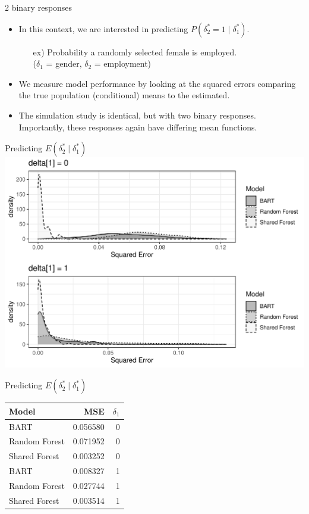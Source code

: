 \documentclass{beamer}
\begin{document}
\begin{frame}{2 binary responses}
\begin{itemize}
\item In this context, we are interested in predicting $P(\delta^*_2=1 \mid \delta^*_1)$.
\begin{itemize}
\item[ex)] Probability a randomly selected female is employed. \\($\delta_1$ = gender, $\delta_2$ = employment)
\end{itemize}
\item We measure model performance by looking at the squared errors comparing the true population (conditional) means to the estimated. 

\item The simulation study is identical, but with two binary responses. Importantly, these responses again have differing mean functions. 
\end{itemize}
\end{frame}

\begin{frame}{Predicting $E(\delta_2^* \mid \delta_1^*)$ }
\includegraphics[width = .9\linewidth]{binary_sim_results.pdf}
\end{frame}

\begin{frame}{Predicting $E(\delta_2^* \mid \delta_1^*)$ }
\begin{table}[ht]
\centering
\begin{tabular}{lrr}
  \hline
Model & MSE & $\delta_1$ \\ 
  \hline
BART & 0.056580 & 0 \\ 
  Random Forest & 0.071952 & 0 \\ 
  Shared Forest & 0.003252 & 0 \\ \hline
  BART & 0.008327 & 1 \\ 
  Random Forest & 0.027744 & 1 \\ 
  Shared Forest & 0.003514 & 1 \\ 
   \hline
\end{tabular}
\end{table}
\end{frame}
\end{document}
